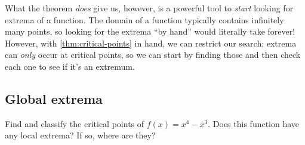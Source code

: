 \documentclass[../book/calcnotes.tex]{subfiles}
\begin{document}
What the theorem \emph{does} give us, however, is a powerful tool to \emph{start} looking for extrema of a function.
The domain of a function typically contains infinitely many points, so looking for the extrema \enquote{by hand} would literally take forever!
However, with \cref{thm:critical-points} in hand, we can restrict our search; extrema can \emph{only} occur at critical points, so we can start by finding those and then check each one to see if it's an extremum.

\subsection{Global extrema}
\label{sec:deriv.extrema.global}

\begin{gps}
    \begin{gp}
    \label{gp:cp-not-extreme}
    Find and classify the critical points of $f(x) = x^{4} - x^{3}$.
    Does this function have any local extrema?
    If so, where are they?
  \end{gp}
\end{gps}

\begin{exercises}
\end{exercises}
\end{document}
